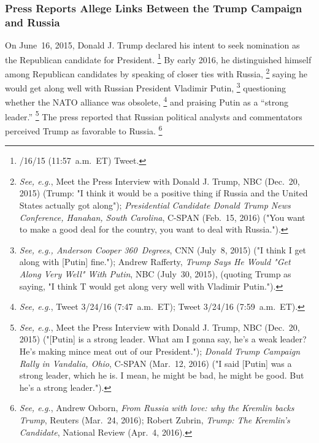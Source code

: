 \subsubsection{Press Reports Allege Links Between the Trump Campaign and Russia}
On June~16, 2015, Donald J. Trump declared his intent to seek nomination as the Republican candidate for President.%
\footnote{/16/15 (11:57~a.m.~ET) Tweet.}
By early 2016, he distinguished himself among Republican candidates by speaking of closer ties with Russia,%
\footnote{\textit{See, e.g.}, Meet the Press Interview with Donald J. Trump, NBC (Dec.~20, 2015) (Trump: "I think it would be a positive thing if Russia and the United States actually got along");
\textit{Presidential Candidate Donald Trump News Conference, Hanahan, South Carolina}, C-SPAN (Feb.~15, 2016) ("You want to make a good deal for the country, you want to deal with Russia.").}
saying he would get along well with Russian President Vladimir Putin,%
\footnote{\textit{See, e.g., Anderson Cooper 360~Degrees}, CNN (July~8, 2015) ("I think I get along with [Putin] fine.");
Andrew Rafferty, \textit{Trump Says He Would "Get Along Very Well" With Putin}, NBC (July~30, 2015), (quoting Trump as saying, "I think T would get along very well with Vladimir Putin.").}
questioning whether the NATO alliance was obsolete,%
\footnote{\textit{See, e.g.}, \@realDonaldTrump Tweet 3/24/16 (7:47~a.m.~ET);
\@realDonaldTrump Tweet 3/24/16 (7:59~a.m.~ET).}
and praising Putin as a ``strong leader.''%
\footnote{\textit{See, e.g.}, Meet the Press Interview with Donald J. Trump, NBC (Dec.~20, 2015) ("[Putin] is a strong leader.
What am I gonna say, he's a weak leader?
He's making mince meat out of our President.");
\textit{Donald Trump Campaign Rally in Vandalia, Ohio}, C-SPAN (Mar.~12, 2016) ("I said [Putin] was a strong leader, which he is.
I mean, he might be bad, he might be good.
But he's a strong leader.").}
The press reported that Russian political analysts and commentators perceived Trump as favorable to Russia.%
\footnote{\textit{See, e.g.}, Andrew Osborn, \textit{From Russia with love: why the Kremlin backs Trump}, Reuters (Mar.~24, 2016);
Robert Zubrin, \textit{Trump: The Kremlin's Candidate}, National Review (Apr.~4, 2016).}

